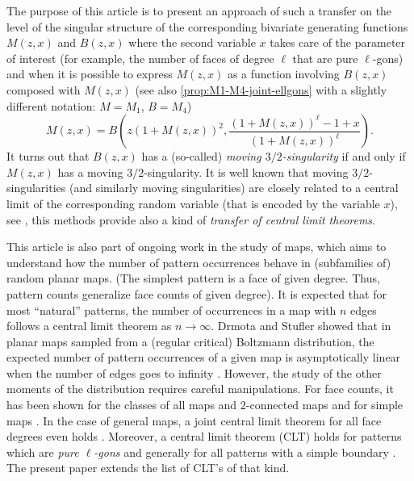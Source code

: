 \documentclass[a4paper,UKenglish,cleveref, autoref, thm-restate]{lipics-v2021}
\renewcommand{\(}{\left(}
\renewcommand{\)}{\right)}
\newcommand{\ellgon}{pure \texorpdfstring{$\ell$}{ell}-gon}
\newcommand{\ellgons}{\ellgon s}
\begin{document}
The purpose of this article is to present an approach of such a transfer on the level
of the singular structure of the corresponding bivariate generating functions
$M(z,x)$ and $B(z,x)$ where the second variable $x$ takes care of the parameter 
of interest (for example, the number of faces of degree $\ell$ that are \ellgons) and
when it is possible to express $M(z,x)$ as a function involving $B(z,x)$ composed
with $M(z,x)$ (see also \cref{prop:M1-M4-joint-ellgons} with a slightly different
notation: $M = M_1$, $B = M_4$) 
\begin{equation}\label{eqMBzxrel}
{M}(z,x) = {B}\(z\(1+{M}(z,x)\)^2,\frac{\(1+{M}(z,x)\)^\ell-1 + x}{\(1+{M}(z,x)\)^\ell}\).
\end{equation}
It turns out that $B(z,x)$ has a (so-called) \emph{moving $3/2$-singularity} if
and only if $M(z,x)$ has a moving $3/2$-singularity. It is well known that
moving $3/2$-singularities (and similarly moving singularities) are
closely related to a central limit of the corresponding random variable (that is
encoded by the variable $x$), see \cite{Drmota09}, this methods provide also a kind of 
\emph{ transfer of central limit theorems}.

This article is also part of ongoing work in the study of maps, which aims to understand how the number of pattern occurrences behave in (subfamilies of) random planar maps. 
(The simplest pattern is a face of given degree. Thus, pattern counts generalize
face counts of given degree). It is expected that for most ``natural'' patterns, the number of occurrences in a map with $n$ edges follows a central limit theorem  as $n\to\infty$. Drmota and Stufler showed that in planar maps sampled from a (regular critical) Boltzmann distribution, the expected number of pattern occurrences of a given map is asymptotically linear when the number of edges goes to infinity \cite{DS19}. However, the study of the other moments of the distribution requires careful manipulations. For face counts, it has been shown for the classes of all maps and $2$-connected maps \cite{DP13} and for simple maps \cite{Yu19}. In the case of general maps, a joint central limit theorem for all face degrees even holds \cite{CDK19}. Moreover, a 
central limit theorem (CLT) holds for patterns which are \emph{\ellgons} \cite{Yu19} and generally for all patterns with a simple boundary \cite{DHW25}. The present paper extends the list 
of CLT's of that kind.
\end{document}
